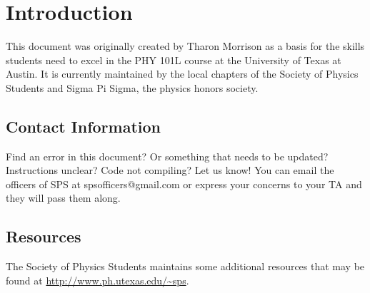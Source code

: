 

\chapter{Introduction}


This document was originally created by Tharon Morrison  as a basis for the skills students need to excel in the PHY 101L course at the University
of Texas at Austin. It is currently maintained by the local chapters of the Society of Physics Students and Sigma Pi Sigma, the physics honors society.

\section{Contact Information}

Find an error in this document? Or something that needs to be updated? Instructions unclear? Code not compiling? Let us know! You can email the officers of SPS at spsofficers@gmail.com
or express your concerns to your TA and they will pass them along.

\section{Resources}

The Society of Physics Students maintains some additional resources that may be found at \url{http://www.ph.utexas.edu/~sps}.